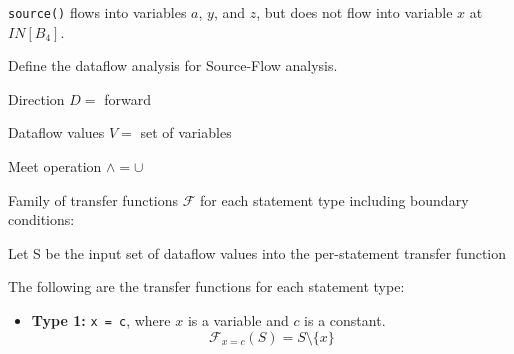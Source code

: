 \documentclass[12pt]{article}
\begin{document}
\begin{enumerate}
      \begin{center}
    \end{center}

      \lstinline$source()$ flows into variables $a$, $y$, and $z$, but does not
      flow into variable $x$ at $IN[B_4]$.

      Define the dataflow analysis for Source-Flow analysis.

      \begin{mdframed}
        Direction $D = $ forward

        Dataflow values $V = $ set of variables

        Meet operation $\wedge = \cup $

        Family of transfer functions $\mathcal{F}$ for each statement type
        including boundary conditions:

        Let S be the input set of dataflow values into the per-statement transfer function

        The following are the transfer functions for each statement type:

        \begin{itemize}

            \item \textbf{Type 1:} \texttt{x = c}, where $x$ is a variable and $c$ is a constant.
            \[
                \mathcal{F}_{x = c}(S) = S \setminus \{x\}
            \]


\end{itemize}
\end{mdframed}
\end{enumerate}
\end{document}

